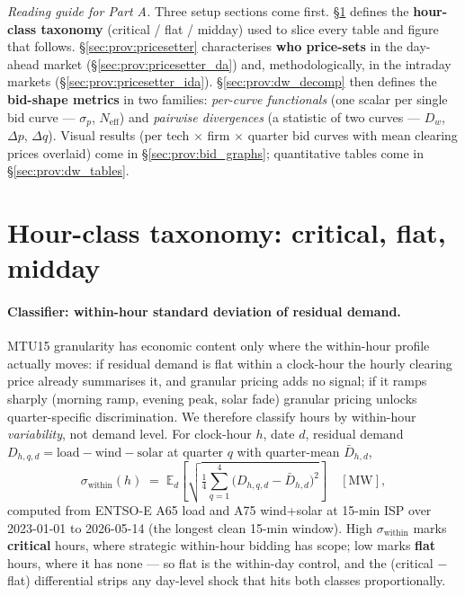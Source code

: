 \documentclass[11pt,a4paper]{article}
\begin{document}
\noindent\emph{Reading guide for Part A.} Three setup sections come first. \S\ref{sec:prov:hour_class} defines the \textbf{hour-class taxonomy} (critical / flat / midday) used to slice every table and figure that follows. \S\ref{sec:prov:pricesetter} characterises \textbf{who price-sets} in the day-ahead market (\S\ref{sec:prov:pricesetter_da}) and, methodologically, in the intraday markets (\S\ref{sec:prov:pricesetter_ida}). \S\ref{sec:prov:dw_decomp} then defines the \textbf{bid-shape metrics} in two families: \emph{per-curve functionals} (one scalar per single bid curve --- $\sigma_p$, $N_{\text{eff}}$) and \emph{pairwise divergences} (a statistic of two curves --- $D_w$, $\Delta p$, $\Delta q$). Visual results (per tech $\times$ firm $\times$ quarter bid curves with mean clearing prices overlaid) come in \S\ref{sec:prov:bid_graphs}; quantitative tables come in \S\ref{sec:prov:dw_tables}.

\section{Hour-class taxonomy: critical, flat, midday}\label{sec:prov:hour_class}

\paragraph{Classifier: within-hour standard deviation of residual demand.}
MTU15 granularity has economic content only where the within-hour profile actually moves: if residual demand is flat within a clock-hour the hourly clearing price already summarises it, and granular pricing adds no signal; if it ramps sharply (morning ramp, evening peak, solar fade) granular pricing unlocks quarter-specific discrimination. We therefore classify hours by within-hour \emph{variability}, not demand level. For clock-hour $h$, date $d$, residual demand $D_{h,q,d} = \text{load} - \text{wind} - \text{solar}$ at quarter $q$ with quarter-mean $\bar D_{h,d}$,
\[
 \sigma_{\text{within}}(h) \;=\; \mathbb{E}_d\!\left[\sqrt{\tfrac{1}{4}\sum_{q=1}^{4}\bigl(D_{h,q,d} - \bar D_{h,d}\bigr)^2}\right] \quad [\text{MW}],
\]
computed from ENTSO-E A65 load and A75 wind+solar at 15-min ISP over 2023-01-01 to 2026-05-14 (the longest clean 15-min window). High $\sigma_{\text{within}}$ marks \textbf{critical} hours, where strategic within-hour bidding has scope; low marks \textbf{flat} hours, where it has none --- so flat is the within-day control, and the (critical $-$ flat) differential strips any day-level shock that hits both classes proportionally.
\end{document}
